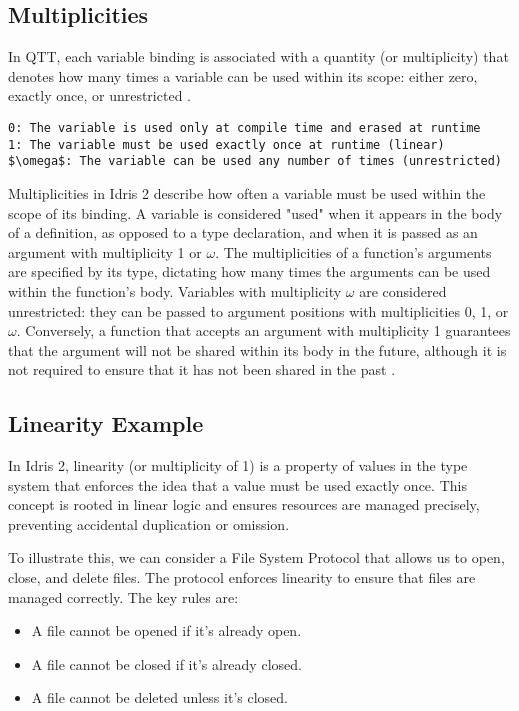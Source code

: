 \documentclass[]{rptuseminar}
\begin{document}
\subsection{Multiplicities}
In QTT, each variable binding is associated with a quantity (or multiplicity) that denotes how many times a variable can be used within its scope: either zero, exactly once, or unrestricted \cite{atkey2018syntax}.

\begin{lstlisting}[mathescape=true]
0: The variable is used only at compile time and erased at runtime
1: The variable must be used exactly once at runtime (linear)
$\omega$: The variable can be used any number of times (unrestricted)
\end{lstlisting}
\vspace{1em}
Multiplicities in Idris 2 describe how often a variable must be used within the scope of its binding. A variable is considered "used" when it appears in the body of a definition, as opposed to a type declaration, and when it is passed as an argument with multiplicity 1 or \(\omega\). The multiplicities of a function's arguments are specified by its type, dictating how many times the arguments can be used within the function's body. Variables with multiplicity \(\omega\) are considered unrestricted: they can be passed to argument positions with multiplicities 0, 1, or \(\omega\). Conversely, a function that accepts an argument with multiplicity 1 guarantees that the argument will not be shared within its body in the future, although it is not required to ensure that it has not been shared in the past \cite{brady2021idris}.

\subsection{Linearity Example}
In Idris 2, linearity (or multiplicity of 1) is a property of values in the type system that enforces the idea that a value must be used exactly once. This concept is rooted in linear logic and ensures resources are managed precisely, preventing accidental duplication or omission.

To illustrate this, we can consider a File System Protocol that allows us to open, close, and delete files. The protocol enforces linearity to ensure that files are managed correctly. The key rules are:
\begin{itemize}
    \item A file cannot be opened if it's already open.
    \item A file cannot be closed if it's already closed.
    \item A file cannot be deleted unless it's closed.
\end{itemize}
\end{document}
